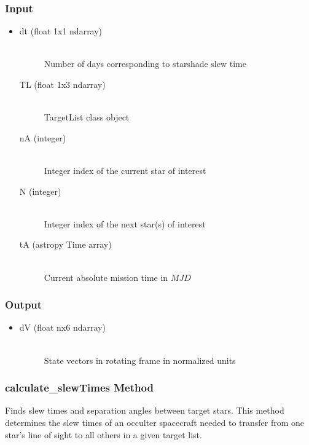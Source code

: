 \documentclass[cleanfoot]{asme2ej}
\begin{document}
\subsubsection*{Input}
\begin{itemize}
\item
\begin{description}
    \item[dt (float 1x1 ndarray)] \hfill \\ Number of days corresponding to starshade slew time
    \item[TL (float 1x3 ndarray)] \hfill \\ TargetList class object
    \item[nA (integer)] \hfill \\ Integer index of the current star of interest
    \item[N (integer)] \hfill \\ Integer index of the next star(s) of interest
    \item[tA (astropy Time array)] \hfill \\ Current absolute mission time in $MJD$
\end{description}
\end{itemize}
\subsubsection*{Output}
\begin{itemize}
\item
\begin{description}
    \item[dV (float nx6 ndarray)] \hfill \\ State vectors in rotating frame in normalized units
\end{description}
\end{itemize}

\subsubsection{calculate\_slewTimes Method} \label{}
Finds slew times and separation angles between target stars. This method determines the slew times of an occulter spacecraft needed to transfer from one star's line of sight to all others in a given target list.
\end{document}
